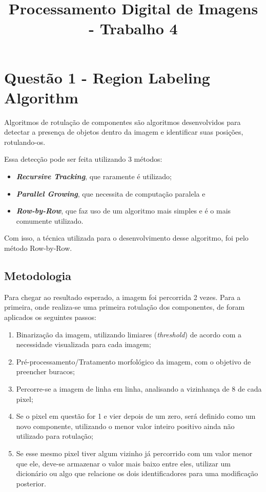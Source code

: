 \documentclass{article}
\title{Processamento Digital de Imagens - Trabalho 4}
\begin{document}
%
\maketitle

%
\section{Questão 1 - Region Labeling Algorithm}
Algoritmos de rotulação de componentes são algoritmos desenvolvidos para detectar a presença de objetos dentro da imagem e identificar suas posições, rotulando-os.

Essa detecção pode ser feita utilizando 3 métodos:

\begin{itemize}
	\item \textbf{\textit{Recursive Tracking}}, que raramente é utilizado;
	\item \textbf{\textit{Parallel Growing}}, que necessita de computação paralela e
	 \item \textbf{\textit{Row-by-Row}}, que faz uso de um algoritmo mais simples e é o mais comumente utilizado.
\end{itemize}

Com isso, a técnica utilizada para o desenvolvimento desse algoritmo, foi pelo método Row-by-Row.

\subsection{Metodologia}
Para chegar ao resultado esperado, a imagem foi percorrida 2 vezes. Para a primeira, onde realiza-se uma primeira rotulação dos componentes, de  foram aplicados os seguintes passos:

\begin{enumerate}
	\item Binarização da imagem, utilizando limiares (\textit{threshold}) de acordo com a necessidade visualizada para cada imagem;
	\item Pré-processamento/Tratamento morfológico da imagem, com o objetivo de preencher buracos;
	\item Percorre-se a imagem de linha em linha, analisando a vizinhança de 8 de cada pixel;
	\item Se o pixel em questão for 1 e vier depois de um zero, será definido como um novo componente, utilizando o menor valor inteiro positivo ainda não utilizado para rotulação;
	\item Se esse mesmo pixel tiver algum vizinho já percorrido com um valor menor que ele, deve-se armazenar o valor mais baixo entre eles, utilizar um dicionário ou algo que relacione os dois identificadores para uma modificação posterior.	
\end{enumerate}
\end{document}
